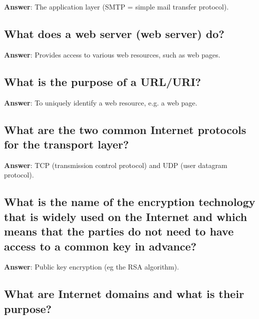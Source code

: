 \documentclass[a4paper,11pt,oneside]{article}
\begin{document}
\begin{sloppypar}
\label{q:145:sa:en:True}

\textbf{Answer}: The application layer (SMTP = simple mail transfer protocol).



\subsection{What does a web server (web server) do?}

\label{q:146:sa:en:True}

\textbf{Answer}: Provides access to various web resources, such as web pages.



\subsection{What is the purpose of a URL/URI?}

\label{q:147:sa:en:True}

\textbf{Answer}: To uniquely identify a web resource, e.g. a web page.



\subsection{What are the two common Internet protocols for the transport layer?}

\label{q:148:sa:en:True}

\textbf{Answer}: TCP (transmission control protocol) and UDP (user datagram protocol).



\subsection{What is the name of the encryption technology that is widely used on the Internet and which means that the parties do not need to have access to a common key in advance?}

\label{q:149:sa:en:True}

\textbf{Answer}: Public key encryption (eg the RSA algorithm).



\subsection{What are Internet domains and what is their purpose?}

\label{q:150:sa:en:True}


\end{sloppypar}
\end{document}
